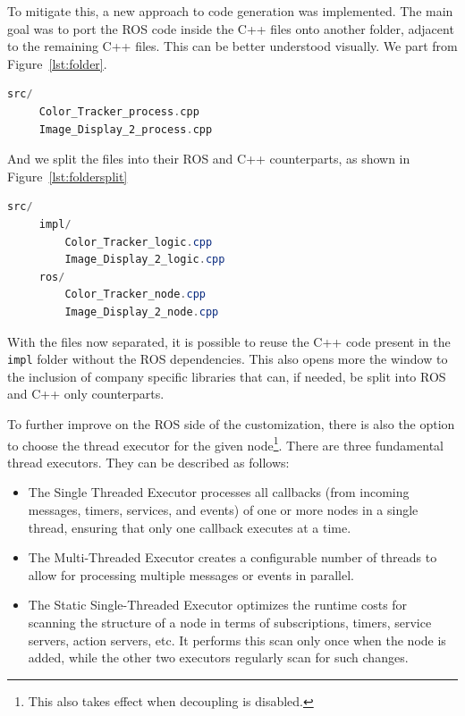 To mitigate this, a new approach to code generation was implemented. The main goal was to port the \gls{ROS} code inside the C++ files onto another folder, adjacent to the remaining C++ files. This can be better understood visually. We part from Figure~\ref{lst:folder}.

\begin{lstlisting}[language=C++, caption={Basic folder structure example}, label={lst:folder}]
src/
	 Color_Tracker_process.cpp
	 Image_Display_2_process.cpp
\end{lstlisting}


And we split the files into their \gls{ROS} and C++ counterparts, as shown in Figure~\ref{lst:foldersplit}

\begin{lstlisting}[language=Java, caption={Split folder structure example}, label={lst:foldersplit}]
src/
	 impl/
		 Color_Tracker_logic.cpp
		 Image_Display_2_logic.cpp
	 ros/
		 Color_Tracker_node.cpp
		 Image_Display_2_node.cpp
\end{lstlisting}

With the files now separated, it is possible to reuse the C++ code present in the \texttt{impl} folder without the \gls{ROS} dependencies. This also opens more the window to the inclusion of company specific libraries that can, if needed, be split into \gls{ROS} and C++ only counterparts.

To further improve on the \gls{ROS} side of the customization, there is also the option to choose the thread executor for the given node\footnote{This also takes effect when decoupling is disabled.}. There are three fundamental thread executors. They can be described as follows:

\begin{itemize} 
	\item The Single Threaded Executor processes all callbacks (from incoming messages, timers, services, and events) of one or more nodes in a single thread, ensuring that only one callback executes at a time.
	\item The Multi-Threaded Executor creates a configurable number of threads to allow for processing multiple messages or events in parallel.
	\item  The Static Single-Threaded Executor optimizes the runtime costs for scanning the structure of a node in terms of subscriptions, timers, service servers, action servers, etc. It performs this scan only once when the node is added, while the other two executors regularly scan for such changes. 
\end{itemize}

